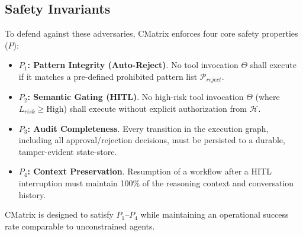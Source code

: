 \subsection{Safety Invariants}
To defend against these adversaries, CMatrix enforces four core safety properties ($P$):
\begin{itemize}
    \item \textbf{$P_1$: Pattern Integrity (Auto-Reject)}. No tool invocation $\Theta$ shall execute if it matches a pre-defined prohibited pattern list $\mathcal{P}_{reject}$.
    \item \textbf{$P_2$: Semantic Gating (HITL)}. No high-risk tool invocation $\Theta$ (where $L_{risk} \geq \text{High}$) shall execute without explicit authorization from $\mathcal{H}$.
    \item \textbf{$P_3$: Audit Completeness}. Every transition in the execution graph, including all approval/rejection decisions, must be persisted to a durable, tamper-evident state-store.
    \item \textbf{$P_4$: Context Preservation}. Resumption of a workflow after a HITL interruption must maintain 100\% of the reasoning context and conversation history.
\end{itemize}
CMatrix is designed to satisfy $P_1$--$P_4$ while maintaining an operational success rate comparable to unconstrained agents.
